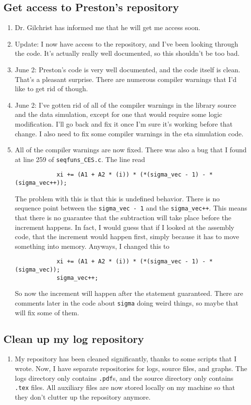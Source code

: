 \documentclass[12 pt]{article}
\begin{document}
	\subsection{Get access to Preston's repository}
	\begin{enumerate}
		\item Dr. Gilchrist has informed me that he will get me access soon.
		\item Update: I now have access to the repository, and I've been looking through the code. It's actually really well documented, so this shouldn't be too bad.
		\item June 2: Preston's code is very well documented, and the code itself is clean. That's a pleasant surprise. There are numerous compiler warnings that I'd like to get rid of though.
		\item June 2: I've gotten rid of all of the compiler warnings in the library source and the data simulation, except for one that would require some logic modification. I'll go back and fix it once I'm sure it's working before that change. I also need to fix some compiler warnings in the eta simulation code.
		\item All of the compiler warnings are now fixed. There was also a bug that I found at line 259 of \texttt{seqfuns\_CES.c}. The line read
		\begin{verbatim}
			xi += (A1 + A2 * (i)) * (*(sigma_vec - 1) - *(sigma_vec++));
		\end{verbatim}
		The problem with this is that this is undefined behavior. There is no sequence point between the \texttt{sigma\_vec - 1} and the \texttt{sigma\_vec++}. This means that there is no guarantee that the subtraction will take place before the increment happens. In fact, I would guess that if I looked at the assembly code, that the increment would happen first, simply because it has to move something into memory. Anyways, I changed this to 
		\begin{verbatim}
			xi += (A1 + A2 * (i)) * (*(sigma_vec - 1) - *(sigma_vec));
			sigma_vec++;
		\end{verbatim}
		So now the increment will happen after the statement guaranteed. There are comments later in the code about \texttt{sigma} doing weird things, so maybe that will fix some of them.
	\end{enumerate}
	
	\subsection{Clean up my log repository}
	\begin{enumerate}
		\item My repository has been cleaned significantly, thanks to some scripts that I wrote. Now, I have separate repositories for logs, source files, and graphs. The logs directory only contains \texttt{.pdf}s, and the source directory only contains \texttt{.tex} files. All auxiliary files are now stored locally on my machine so that they don't clutter up the repository anymore. 
	\end{enumerate}
\end{document}
